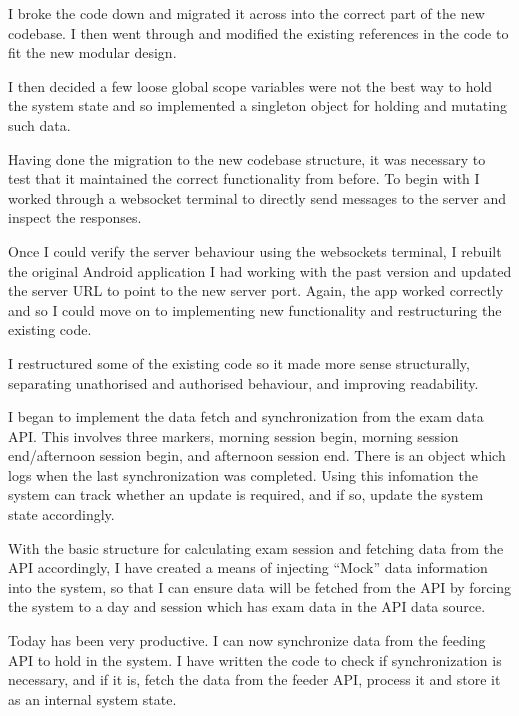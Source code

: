 \documentclass[idxtotoc,hyperref,openany]{labbook} %
\begin{document}
I broke the code down and migrated it across into the correct part of the new codebase.  I then went through and modified the existing references in the code to fit the new modular design.

I then decided a few loose global scope variables were not the best way to hold the system state and so implemented a singleton object for holding and mutating such data.



Having done the migration to the new codebase structure, it was necessary to test that it maintained the correct functionality from before.  To begin with I worked through a websocket terminal to directly send messages to the server and inspect the responses.

Once I could verify the server behaviour using the websockets terminal, I rebuilt the original Android application I had working with the past version and updated the server URL to point to the new server port.  Again, the app worked correctly and so I could move on to implementing new functionality and restructuring the existing code.

I restructured some of the existing code so it made more sense structurally, separating unathorised and authorised behaviour, and improving readability.

I began to implement the data fetch and synchronization from the exam data API.  This involves three markers, morning session begin, morning session end/afternoon session begin, and afternoon session end.  There is an object which logs when the last synchronization was completed.  Using this infomation the system can track whether an update is required, and if so, update the system state accordingly.



With the basic structure for calculating exam session and fetching data from the API accordingly, I have created a means of injecting ``Mock'' data information into the system, so that I can ensure data will be fetched from the API by forcing the system to a day and session which has exam data in the API data source.

Today has been very productive.  I can now synchronize data from the feeding API to hold in the system.  I have written the code to check if synchronization is necessary, and if it is, fetch the data from the feeder API, process it and store it as an internal system state.
\end{document}
